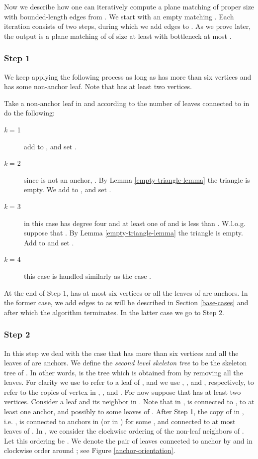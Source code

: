 \documentclass[11pt,a4paper]{article}
\begin{document}
Now we describe how one can iteratively compute a plane matching of proper size with bounded-length edges from . We start with an empty matching . Each iteration consists of two steps, during which we add edges to . As we prove later, the output is a plane matching of  of size at least  with bottleneck at most .

\subsubsection{Step 1}

We keep applying the following process as long as  has more than six vertices and  has some non-anchor leaf. Note that  has at least two vertices.
 
Take a non-anchor leaf  in  and according to the number  of leaves connected to  in  do the following:
 \begin{description}
  \item[{\em k} = 1] add  to , and set . 
  \item[{\em k} = 2] since  is not an anchor, . By Lemma \ref{empty-triangle-lemma} the triangle  is empty. We add  to , and set .
  \item[{\em k} = 3] in this case  has degree four and at least one of  and  is less than . W.l.o.g. suppose that . By Lemma \ref{empty-triangle-lemma} the triangle  is empty. Add  to  and set . 
  \item[{\em k} = 4] this case is handled similarly as the case .
 \end{description}

At the end of Step 1,  has at most six vertices or all the leaves of  are anchors. In the former case, we add edges to  as will be described in Section \ref{base-cases} and after which the algorithm terminates. In the latter case we go to Step 2.

\subsubsection{Step 2}

In this step we deal with the case that  has more than six vertices and all the leaves of  are anchors. We define the {\em second level skeleton tree}  to be the skeleton tree of . In other words,  is the tree which is obtained from  by removing all the leaves. For clarity we use  to refer to a leaf of , and we use , , and , respectively, to refer to the copies of vertex  in , , and . For now suppose that  has at least two vertices. Consider a leaf  and its neighbor  in . Note that in ,  is connected to , to at least one anchor, and possibly to some leaves of . After Step 1, the copy of  in , i.e. , is connected to anchors  in  (or  in ) for some , and connected to at most  leaves of . In , we consider the clockwise ordering of the non-leaf neighbors of . Let this ordering be . We denote the pair of leaves connected to anchor  by  and  in clockwise order around ; see Figure \ref{anchor-orientation}. 
\end{document}

